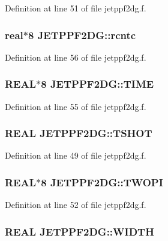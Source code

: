 Definition at line 51 of file jetppf2dg.f.\hypertarget{namespaceJETPPF2DG_be3c9bcf4058d9ec55ba6288bdef97fb}{
\subsubsection[rcntc]{\setlength{\rightskip}{0pt plus 5cm}real$\ast$8 {\bf JETPPF2DG::rcntc}}}
\label{namespaceJETPPF2DG_be3c9bcf4058d9ec55ba6288bdef97fb}




Definition at line 56 of file jetppf2dg.f.\hypertarget{namespaceJETPPF2DG_c9078c3f7f6a9052eb87d78ea959db39}{
\subsubsection[TIME]{\setlength{\rightskip}{0pt plus 5cm}REAL$\ast$8 {\bf JETPPF2DG::TIME}}}
\label{namespaceJETPPF2DG_c9078c3f7f6a9052eb87d78ea959db39}




Definition at line 55 of file jetppf2dg.f.\hypertarget{namespaceJETPPF2DG_40cdb8daca293ee227018204f477a568}{
\subsubsection[TSHOT]{\setlength{\rightskip}{0pt plus 5cm}REAL {\bf JETPPF2DG::TSHOT}}}
\label{namespaceJETPPF2DG_40cdb8daca293ee227018204f477a568}




Definition at line 49 of file jetppf2dg.f.\hypertarget{namespaceJETPPF2DG_0071ea355e749981556deb6108904af9}{
\subsubsection[TWOPI]{\setlength{\rightskip}{0pt plus 5cm}REAL$\ast$8 {\bf JETPPF2DG::TWOPI}}}
\label{namespaceJETPPF2DG_0071ea355e749981556deb6108904af9}




Definition at line 52 of file jetppf2dg.f.\hypertarget{namespaceJETPPF2DG_eeb6ada756a20d433b90d04807324eec}{
\subsubsection[WIDTH]{\setlength{\rightskip}{0pt plus 5cm}REAL {\bf JETPPF2DG::WIDTH}}}
\label{namespaceJETPPF2DG_eeb6ada756a20d433b90d04807324eec}




